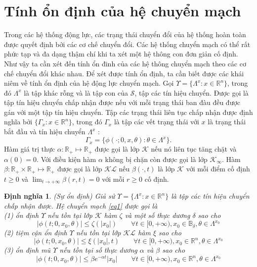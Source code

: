 \documentclass[14pt,a4paper,oneside]{report}		%
\newtheorem{define}{Định nghĩa}[chapter]
\begin{document}
\section{Tính ổn định của hệ chuyển mạch}
Trong các hệ thống động lực, các trạng thái chuyển đổi của hệ thống hoàn toàn được quyết định bởi các cơ chế chuyển đổi. Các hệ thống chuyển mạch có thể rất phức tạp và đa dạng thậm chí khi ta xét một hệ thông con đơn giản cố định. Như vậy ta cần xét đến tính ổn đinh của các hệ thông chuyển mạch theo các cơ chế chuyển đổi khác nhau. Để xét được tính ổn định, ta cần biết được các khái niêm về tính ổn định của hệ động lực chuyển mạch.
Gọi $\Upsilon = \{\Lambda^x:x\in\mathbb{R}^n\}$, trong đó $\Lambda^x$ là tập khác rỗng và là tập con của $\mathcal{S}$, tập các tín hiệu chuyển. Được gọi là tập tín hiệu chuyển chấp nhận được nếu với mỗi trạng thái ban đàu đều được gán với một tập tín hiệu chuyển. Tập các trạng thái liên tục chấp nhận được định nghĩa bởi $\{\Gamma_x:x\in\mathbb{R}^n\}$, trong đó $\Gamma_x$ là tập các vết trạng thái với $x$ là trạng thái bắt đầu và tín hiệu chuyển $\Lambda^x$ :
$$\Gamma_x = \{\phi(\cdot;0,x,\theta):\theta\in\Lambda^x\}.$$
Hàm giá trị thực $\alpha :\mathbb{R}_+ \mapsto \mathbb{R}_+$ được gọi là lớp $\mathcal{K}$ nếu nó liên tục tăng chặt và $\alpha(0)=0$. Với điều kiện hàm $\alpha$ không bị chặn còn được gọi là lớp $\mathcal{K}_\infty$. Hàm $\beta : \mathbb{R}_+ \times \mathbb{R}_+ \mapsto \mathbb{R}_+$ được gọi là lớp $\mathcal{KL}$ nếu $\beta(\cdot,t)$ là lớp $\mathcal{K}$ với mỗi điểm cố định $t \geq 0$ và $\lim_{t\rightarrow +\infty}\beta(r,t)=0$ với mỗi $r\geq 0$ cố định.

\begin{define} (Sự ổn định) Giả sử $\Upsilon = \{\Lambda^x:x\in\mathbb{R}^n\}$ là tập các tín hiệu chuyển chấp nhận được. Hệ chuyển mạch \ref{eq1} được gọi là \\
(1) ổn định $\Upsilon$ nếu tồn tại lớp $\mathcal{K}$ hàm $\zeta$ và một số thực dương $\delta$ sao cho
$$|\phi(t;0,x_0,\theta)|\leq\zeta(|x_0|)\qquad\forall t \in [0,+\infty ), x_0 \in\mathbb{B}_\delta , \theta \in\Lambda^{x_0}$$
(2) tiệm cận ổn định $\Upsilon$ nếu tồn tại lớp $\mathcal{KL}$ hàm $\xi$ sao cho
$$|\phi(t;0,x_0,\theta)|\leq\xi(|x_0|,t)\qquad\forall t \in [0,+\infty ), x_0 \in\mathbb{R}^n , \theta \in\Lambda^{x_0}$$
(3) ổn định mũ $\Upsilon$ nếu tồn tại số thực dương $\alpha$ và $\beta$ sao cho
$$|\phi(t;0,x_0,\theta)|\leq \beta e^{-\alpha t}|x_0|\qquad\forall t \in [0,+\infty ), x_0 \in\mathbb{R}^n , \theta \in\Lambda^{x_0}$$
\end{define}
\end{document}

